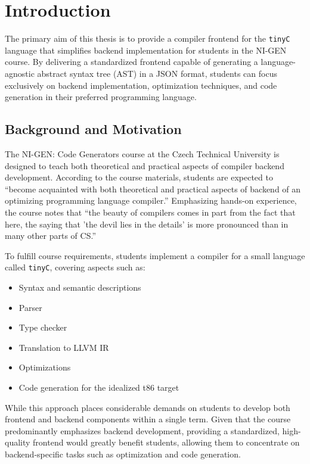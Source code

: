 \chapter{Introduction}

The primary aim of this thesis is to provide a compiler frontend for the \texttt{tinyC} language that simplifies backend implementation for students in the NI-GEN course. By delivering a standardized frontend capable of generating a language-agnostic abstract syntax tree (AST) in a JSON format, students can focus exclusively on backend implementation, optimization techniques, and code generation in their preferred programming language.


\section{Background and Motivation}

The NI-GEN: Code Generators course at the Czech Technical University is designed to teach both theoretical and practical aspects of compiler backend development. According to the course materials, students are expected to ``become acquainted with both theoretical and practical aspects of backend of an optimizing programming language compiler.'' Emphasizing hands-on experience, the course notes that ``the beauty of compilers comes in part from the fact that here, the saying that 'the devil lies in the details' is more pronounced than in many other parts of CS.''

To fulfill course requirements, students implement a compiler for a small language called \texttt{tinyC}, covering aspects such as:
\begin{itemize}
\item Syntax and semantic descriptions
\item Parser
\item Type checker
\item Translation to LLVM IR
\item Optimizations
\item Code generation for the idealized t86 target
\end{itemize}

While this approach places considerable demands on students to develop both frontend and backend components within a single term. Given that the course predominantly emphasizes backend development, providing a standardized, high-quality frontend would greatly benefit students, allowing them to concentrate on backend-specific tasks such as optimization and code generation.

